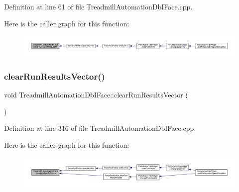 Definition at line 61 of file Treadmill\+Automation\+Db\+I\+Face.\+cpp.

Here is the caller graph for this function\+:
\nopagebreak
\begin{figure}[H]
\begin{center}
\leavevmode
\includegraphics[width=350pt]{class_treadmill_automation_db_i_face_a2f0bbbf8e3a2843c296471175f879bde_icgraph}
\end{center}
\end{figure}
\mbox{\label{class_treadmill_automation_db_i_face_a44f6713e4eb6f55d8e862c7005f77e55}} 
\subsubsection{\texorpdfstring{clear\+Run\+Results\+Vector()}{clearRunResultsVector()}}
{\footnotesize\ttfamily void Treadmill\+Automation\+Db\+I\+Face\+::clear\+Run\+Results\+Vector (\begin{DoxyParamCaption}{ }\end{DoxyParamCaption})}



Definition at line 316 of file Treadmill\+Automation\+Db\+I\+Face.\+cpp.

Here is the caller graph for this function\+:
\nopagebreak
\begin{figure}[H]
\begin{center}
\leavevmode
\includegraphics[width=350pt]{class_treadmill_automation_db_i_face_a44f6713e4eb6f55d8e862c7005f77e55_icgraph}
\end{center}
\end{figure}
\mbox{\label{class_treadmill_automation_db_i_face_acee195f59106d1c96ca0cefe00e0e3f7}} 
